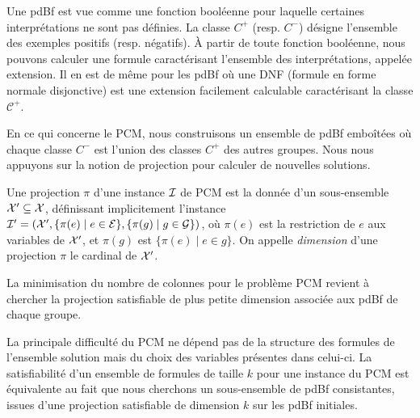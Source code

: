 Une pdBf est vue comme une fonction booléenne pour laquelle  certaines interprétations ne
sont pas définies.
La classe ${C}^{+}$ (resp. ${C}^{-}$)  désigne l'ensemble des exemples positifs
(resp. négatifs).
À partir de toute fonction booléenne, nous pouvons calculer une formule
caractérisant l'ensemble des interprétations, appelée extension. Il en est de
même pour les pdBf où une DNF (formule en forme normale disjonctive) est une
extension facilement calculable caractérisant la classe $\mathcal{C}^+$.

En ce qui concerne le PCM, nous construisons un ensemble de pdBf emboîtées où
chaque classe ${C}^{-}$ est l'union des classes ${C}^{+}$ des autres groupes.
Nous nous appuyons sur la notion de projection pour calculer de nouvelles
solutions.

\begin{definition}[Projection]
Une projection $\pi$ d'une instance ${\cal I}$ de PCM est la donnée d'un
sous-ensemble ${\cal X'} \subseteq {\cal X}$, définissant implicitement
l'instance ${\cal I'} = ({\cal X'},\{\pi(e) \mid e \in  {\cal E} \},\{ \pi(g)
\mid g \in {\cal G}\})$, où $\pi(e)$ est la restriction de $e$ aux variables de
${\cal X'}$, et $\pi(g)$ est $\{\pi(e)\mid e\in g\}$. On appelle
\emph{dimension} d'une projection $\pi$  le cardinal de ${\cal X'}$.
\end{definition}

La minimisation du nombre de colonnes pour le problème PCM revient à chercher la
projection satisfiable de plus petite dimension associée aux pdBf de chaque
groupe.

La principale difficulté du PCM ne dépend pas de la structure des formules de
l'ensemble solution mais du choix des variables présentes dans celui-ci. La
satisfiabilité d'un ensemble de formules de taille $k$  pour une instance du PCM est équivalente au fait que nous cherchons un sous-ensemble de pdBf consistantes, issues d'une projection satisfiable de dimension $k$ sur les pdBf initiales.

